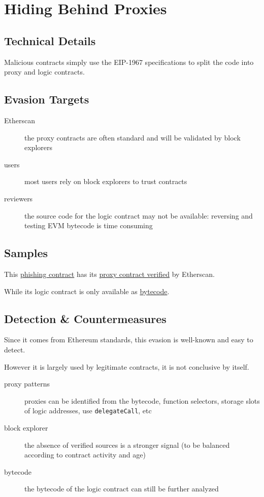 \section{Hiding Behind Proxies} \label{sec:hiding-behind-proxies}

\subsection{Technical Details}

Malicious contracts simply use the EIP-1967 \cite{eip-1967} specifications to split the code into proxy and logic contracts.

\subsection{Evasion Targets}

\begin{description}
\item[Etherscan]{the proxy contracts are often standard and will be validated by block explorers}
\item[users]{most users rely on block explorers to trust contracts}
\item[reviewers]{the source code for the logic contract may not be available: reversing and testing EVM bytecode is time consuming}
\end{description}

\subsection{Samples}

This \href{}{phishing contract} has its \href{}{proxy contract verified} by Etherscan.

While its logic contract is only available as \href{}{bytecode}.

\subsection{Detection \& Countermeasures}

Since it comes from Ethereum standards, this evasion is well-known and easy to detect.

However it is largely used by legitimate contracts, it is not conclusive by itself.

\begin{description}
\item[proxy patterns]{proxies can be identified from the bytecode, function selectors, storage slots of logic addresses, use \lstinline{delegateCall}, etc}
\item[block explorer]{the absence of verified sources is a stronger signal (to be balanced according to contract activity and age)}
\item[bytecode]{the bytecode of the logic contract can still be further analyzed}
\end{description}
